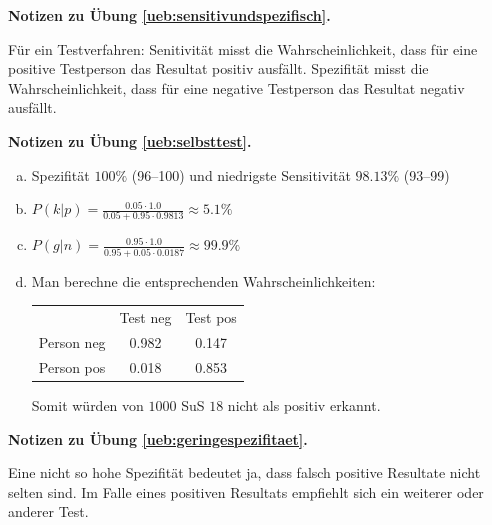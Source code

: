 \documentclass[%
11pt,%
twoside,%
titlepage,%
german,%
headsepline%
]{scrartcl}
\newcommand{\spaltenheight}{\rule{0mm}{3ex}}
\newcommand{\spaltensep}{\\[1ex]}
\newcommand{\concatueb}[1]{ueb:#1}%
\newcommand{\concatlsg}[1]{lsg:#1}%
\newenvironment{lsg}[1]{%
    \par\noindent\textbf{Notizen zu Übung \ref{\concatueb{#1}}.}%
    \label{\concatlsg{#1}}
}{%
    \par%
}
\begin{document}
\begin{lsg}{sensitivundspezifisch}
    Für ein Testverfahren: Senitivität misst die Wahrscheinlichkeit, dass für eine positive Testperson das Resultat positiv ausfällt. Spezifität misst die Wahrscheinlichkeit, dass für eine negative Testperson das Resultat negativ ausfällt.
\end{lsg}
\begin{lsg}{selbsttest}
    \begin{enumerate}[a)]
        \item Spezifität $100\%$ (96--100) und niedrigste Sensitivität $98.13\%$ (93--99)
        \item $P(k|p)=\frac{0.05\cdot1.0}{0.05+0.95\cdot0.9813}\approx5.1\%$
        \item $P(g|n)=\frac{0.95\cdot1.0}{0.95+0.05\cdot0.0187}\approx99.9\%$
        \item Man berechne die entsprechenden Wahrscheinlichkeiten:\\
        
        \begin{table}[h]
\begin{center}
\begin{tabular}{|l|c|c|}
\hline
\rowcolor{Gray}\spaltenheight & Test neg & Test pos \spaltensep \hhline{|-|-|-|}
\rowcolor{lightyellow}\spaltenheight  Person neg & 0.982 & 0.147 \spaltensep \hhline{|-|-|-|}
\rowcolor{Gray}\spaltenheight  Person pos & 0.018 & 0.853 \spaltensep \hline
\end{tabular}
\end{center}
\end{table}
Somit würden von $1000$ SuS $18$ nicht als positiv erkannt.
    \end{enumerate}
\end{lsg}
\begin{lsg}{geringespezifitaet}
    Eine nicht so hohe Spezifität bedeutet ja, dass falsch positive Resultate nicht selten sind. Im Falle eines positiven Resultats empfiehlt sich ein weiterer oder anderer Test.
\end{lsg}
\end{document}
